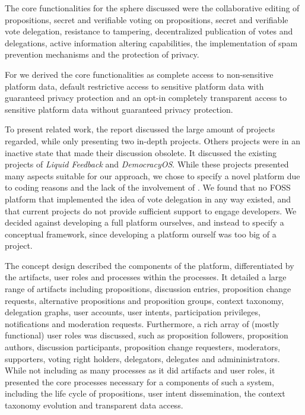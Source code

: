 The core functionalities for the  sphere discussed were the collaborative editing of propositions, secret and verifiable voting on propositions, secret and verifiable vote delegation, resistance to tampering, decentralized publication of votes and delegations, active information altering capabilities, the implementation of spam prevention mechanisms and the protection of
privacy.

For  we derived the core functionalities as complete access to non-sensitive platform data, default restrictive access to sensitive platform data with guaranteed privacy protection and an opt-in completely transparent access to sensitive platform data without guaranteed privacy protection.

To present related work, the report discussed the large amount of projects regarded, while only presenting two in-depth projects. Others projects were in an inactive state that made their discussion obsolete.
It discussed the existing projects of \textit{Liquid Feedback} and \textit{DemocracyOS}.
While these projects presented many aspects suitable for our approach, we chose to specify a novel platform due to coding reasons and the lack of the involvement of .
We found that no FOSS platform that implemented the idea of vote delegation in any way existed, and that current projects do not provide sufficient support to engage developers.
We decided against developing a full platform ourselves, and instead to specify a conceptual framework, since developing a platform ourself was too big of a project.

The concept design described the components of the platform, differentiated by the artifacts, user roles and processes within the processes.
It detailed a large range of artifacts including propositions, discussion entries, proposition change requests, alternative propositions and proposition groups, context taxonomy, delegation graphs, user accounts, user intents, participation privileges, notifications and moderation requests. 
Furthermore, a rich array of (mostly functional) user roles was discussed, such as proposition followers, proposition authors, discussion participants, proposition change requesters, moderators, supporters, voting right holders, delegators, delegates and admininistrators. 
While not including as many processes as it did artifacts and user roles, it presented the core processes necessary for a  components of such a system, including the life cycle of propositions, user intent dissemination, the context taxonomy evolution and transparent data access.

